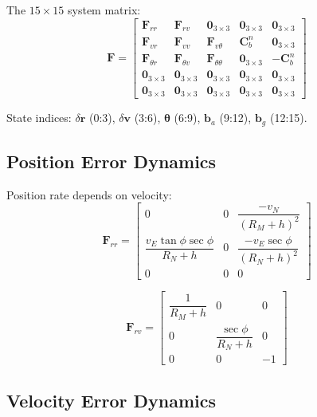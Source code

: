 \documentclass[11pt,a4paper]{article}
\newcommand{\mat}[1]{\mathbf{#1}}
\newcommand{\vect}[1]{\boldsymbol{#1}}
\begin{document}
The $15 \times 15$ system matrix:
\begin{equation}
    \mat{F} = \begin{bmatrix}
        \mat{F}_{rr} & \mat{F}_{rv} & \mat{0}_{3\times3} & \mat{0}_{3\times3} & \mat{0}_{3\times3} \\
        \mat{F}_{vr} & \mat{F}_{vv} & \mat{F}_{v\theta} & \mat{C}_b^n & \mat{0}_{3\times3} \\
        \mat{F}_{\theta r} & \mat{F}_{\theta v} & \mat{F}_{\theta\theta} & \mat{0}_{3\times3} & -\mat{C}_b^n \\
        \mat{0}_{3\times3} & \mat{0}_{3\times3} & \mat{0}_{3\times3} & \mat{0}_{3\times3} & \mat{0}_{3\times3} \\
        \mat{0}_{3\times3} & \mat{0}_{3\times3} & \mat{0}_{3\times3} & \mat{0}_{3\times3} & \mat{0}_{3\times3}
    \end{bmatrix}
    \label{eq:F_matrix}
\end{equation}

State indices: $\delta\mat{r}$ (0:3), $\delta\mat{v}$ (3:6), $\vect{\theta}$ (6:9), $\mat{b}_a$ (9:12), $\mat{b}_g$ (12:15).

\subsection{Position Error Dynamics}

Position rate depends on velocity:
\begin{equation}
    \mat{F}_{rr} = \begin{bmatrix}
        0 & 0 & \dfrac{-v_N}{(R_M+h)^2} \\[1em]
        \dfrac{v_E \tan\phi \sec\phi}{R_N+h} & 0 & \dfrac{-v_E \sec\phi}{(R_N+h)^2} \\[1em]
        0 & 0 & 0
    \end{bmatrix}
\end{equation}

\begin{equation}
    \mat{F}_{rv} = \begin{bmatrix}
        \dfrac{1}{R_M+h} & 0 & 0 \\[1em]
        0 & \dfrac{\sec\phi}{R_N+h} & 0 \\[1em]
        0 & 0 & -1
    \end{bmatrix}
\end{equation}

\subsection{Velocity Error Dynamics}
\end{document}
